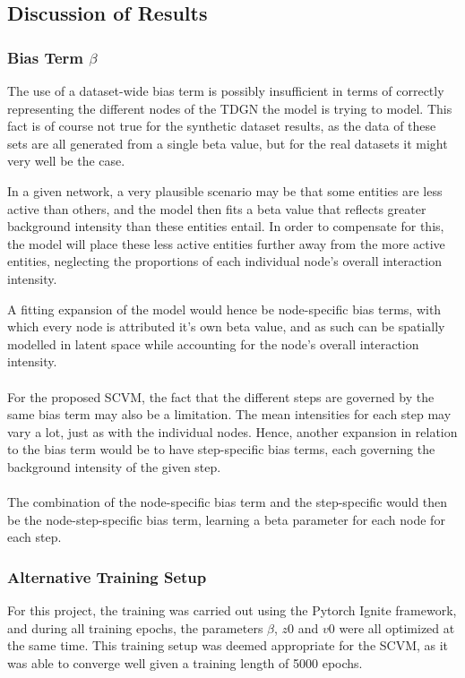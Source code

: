 \subsection{Discussion of Results}
\label{sec:Discussion:Results}


\subsubsection{Bias Term $\beta$}
\label{sec:Discussion:Results:BiasTerm}
The use of a dataset-wide bias term is possibly insufficient in terms of correctly representing the different nodes of the TDGN the model is trying to model. 
This fact is of course not true for the synthetic dataset results, as the data of these sets are all generated from a single beta value, but for the real datasets it might very well be the case.

In a given network, a very plausible scenario may be that some entities are less active than others, and the model then fits a beta value that reflects greater background intensity than these entities entail.
In order to compensate for this, the model will place these less active entities further away from the more active entities, neglecting the proportions of each individual node's overall interaction intensity.

A fitting expansion of the model would hence be node-specific bias terms, with which every node is attributed it's own beta value, and as such can be spatially modelled in latent space while accounting for the node's overall interaction intensity. 
\\\\
For the proposed SCVM, the fact that the different steps are governed by the same bias term may also be a limitation. 
The mean intensities for each step may vary a lot, just as with the individual nodes.
Hence, another expansion in relation to the bias term would be to have step-specific bias terms, each governing the background intensity of the given step.
\\\\
The combination of the node-specific bias term and the step-specific would then be the node-step-specific bias term, learning a beta parameter for each node for each step.


\subsubsection{Alternative Training Setup}
\label{sec:Discussion:Results:AlternativeTrainingSetups}
For this project, the training was carried out using the Pytorch Ignite framework, and during all training epochs, the parameters $\beta$, $z0$ and $v0$ were all optimized at the same time.
This training setup was deemed appropriate for the SCVM, as it was able to converge well given a training length of 5000 epochs.

